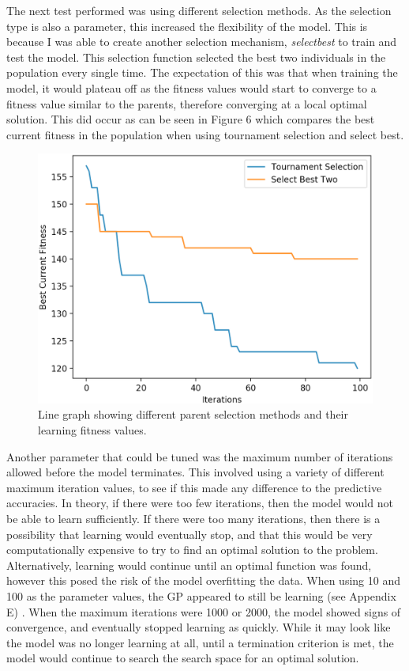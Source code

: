 \documentclass[11pt]{article}
\begin{document}
The next test performed was using different selection methods. As the selection type is also a parameter, this increased the flexibility of the model. This is because I was able to create another selection mechanism, \textit{select\textunderscore best} to train and test the model. This selection function selected the best two individuals in the population every single time. The expectation of this was that when training the model, it would plateau off as the fitness values would start to converge to a fitness value similar to the parents, therefore converging at a local optimal solution. This did occur as can be seen in Figure 6  which compares the best current fitness in the population when using tournament selection and select best. 
\begin{figure}[h]
\centering
\includegraphics[scale = .40]{learning}
\caption{Line graph showing different parent selection methods and their learning fitness values. } 
\end{figure}
Another parameter that could be tuned was the maximum number of iterations allowed before the model terminates. This involved using a variety of different maximum iteration values, to see if this made any difference to the predictive accuracies. In theory, if there were too few iterations, then the model would not be able to learn sufficiently. If there were too many iterations, then there is a possibility that learning would eventually stop, and that this would be very computationally expensive to try to find an optimal solution to the problem. Alternatively, learning would continue until an optimal function was found, however this posed the risk of the model overfitting the data. When using 10 and 100 as the parameter values, the GP appeared to still be learning (see Appendix E) . When the maximum iterations were 1000 or 2000, the model showed signs of convergence, and eventually stopped learning as quickly. While it may look like the model was no longer learning at all, until a termination criterion is met, the model would continue to search the search space for an optimal solution.
\end{document}
